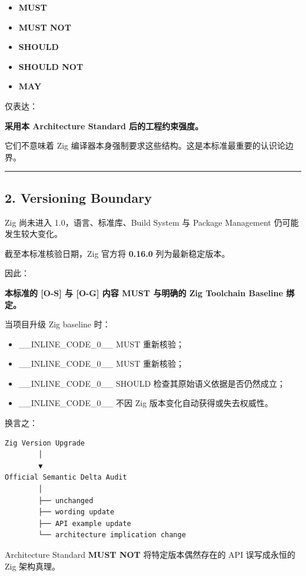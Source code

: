 \documentclass[11pt,a4paper]{article}
\begin{document}
\begin{itemize}
  \item \textbf{MUST}
  \item \textbf{MUST NOT}
  \item \textbf{SHOULD}
  \item \textbf{SHOULD NOT}
  \item \textbf{MAY}
\end{itemize}
仅表达：

\begin{gfmBlockquote}
\textbf{采用本 Architecture Standard 后的工程约束强度。}
\end{gfmBlockquote}
它们不意味着 Zig 编译器本身强制要求这些结构。这是本标准最重要的认识论边界。

\vspace{0.5em}\hrule\vspace{0.5em}
\subsection{2. Versioning Boundary}
Zig 尚未进入 1.0，语言、标准库、Build System 与 Package Management 仍可能发生较大变化。

截至本标准核验日期，Zig 官方将 \textbf{0.16.0} 列为最新稳定版本。

因此：

\begin{gfmBlockquote}
\textbf{本标准的 [O-S] 与 [O-G] 内容 MUST 与明确的 Zig Toolchain Baseline 绑定。}
\end{gfmBlockquote}
当项目升级 Zig baseline 时：

\begin{itemize}
  \item \_\_INLINE\_CODE\_0\_\_ MUST 重新核验；
  \item \_\_INLINE\_CODE\_0\_\_ MUST 重新核验；
  \item \_\_INLINE\_CODE\_0\_\_ SHOULD 检查其原始语义依据是否仍然成立；
  \item \_\_INLINE\_CODE\_0\_\_ 不因 Zig 版本变化自动获得或失去权威性。
\end{itemize}
换言之：

\begin{lstlisting}[language=text]
Zig Version Upgrade
        │
        ▼
Official Semantic Delta Audit
        │
        ├── unchanged
        ├── wording update
        ├── API example update
        └── architecture implication change
\end{lstlisting}
Architecture Standard \textbf{MUST NOT} 将特定版本偶然存在的 API 误写成永恒的 Zig 架构真理。
\end{document}
